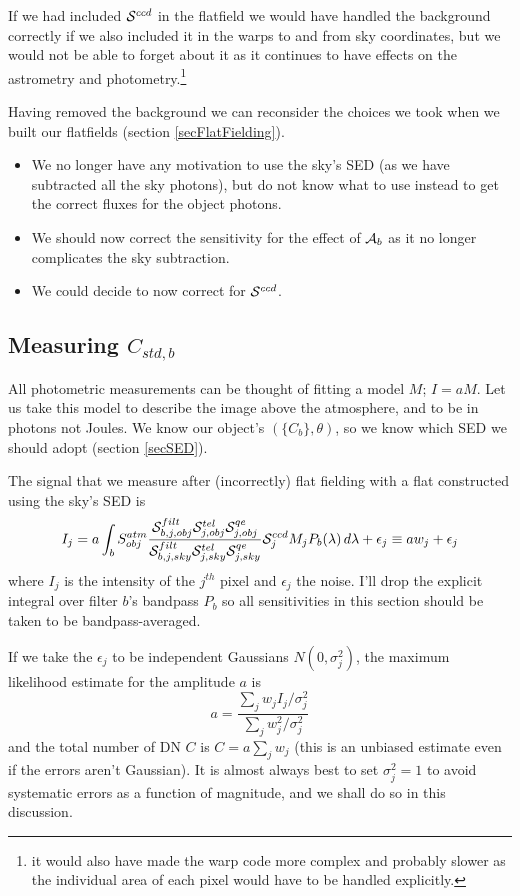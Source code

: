 \documentclass[12pt]{article}
\newcommand{\additive}{{\cal A}}
\newcommand{\qe}{{\cal S}}
\begin{document}
If we had included $\qe^{ccd}$ in the flatfield we would have handled the background correctly if we also
included it in the warps to and from sky coordinates, but we would not be able to forget about it as it
continues to have effects on the astrometry and photometry.\footnote{ it would also have made the warp code
  more complex and probably slower as the individual area of each pixel would have to be handled explicitly.
}

Having removed the background we can reconsider the choices we took when we built our flatfields
(section \ref{secFlatFielding}).
\begin{itemize}
   \item We no longer have any motivation to use the sky's SED (as we have subtracted all the sky photons),
     but do not know what to use instead to get the correct fluxes for the object photons.
   \item We should now correct the sensitivity for the effect of $\additive_b$ as it no longer complicates
     the sky subtraction.
   \item We could decide to now correct for $\qe^{ccd}$.
\end{itemize}

\subsection{Measuring \texorpdfstring{$C_{std, b}$}{Cstd}}

All photometric measurements can be thought of fitting a model $M$; $I = a M$.  Let us take this
model to describe the image above the atmosphere, and to be in photons not Joules.
We know our object's $(\{C_b\}, \theta)$, so we know which SED we should adopt (section \ref{secSED}).

The signal that we measure after (incorrectly) flat fielding with a flat constructed using the sky's SED is
$$
I_j = a \int_{b} S_{obj}^{atm} \frac{\qe_{b, j, obj}^{filt} \qe_{j,obj}^{tel} \qe_{j,obj}^{qe}}
                                    {\qe_{b, j, sky}^{filt} \qe_{j,sky}^{tel} \qe_{j,sky}^{qe}}
            \qe_j^{ccd} M_j P_b(\lambda)\, d\lambda + \epsilon_j
    \equiv a w_j + \epsilon_j
$$
where $I_j$ is the intensity of the $j^{th}$ pixel and $\epsilon_j$ the noise.  I'll drop the explicit
integral over filter $b$'s bandpass $P_b$ so all sensitivities in this section should be taken to be
bandpass-averaged.

If we take the $\epsilon_j$ to be independent Gaussians $N(0, \sigma_j^2)$, the maximum likelihood estimate
for the amplitude $a$ is
$$
a = \frac{\sum_j w_j I_j/\sigma_j^2}{\sum_j w_j^2/\sigma_j^2}
$$
and the total number of DN $C$ is $C = a\sum_j w_j$
(this is an unbiased estimate even if the errors aren't Gaussian).
It is almost always best
to set $\sigma^2_j = 1$ to avoid systematic errors as a function of magnitude, and we shall do so
in this discussion.
\end{document}
